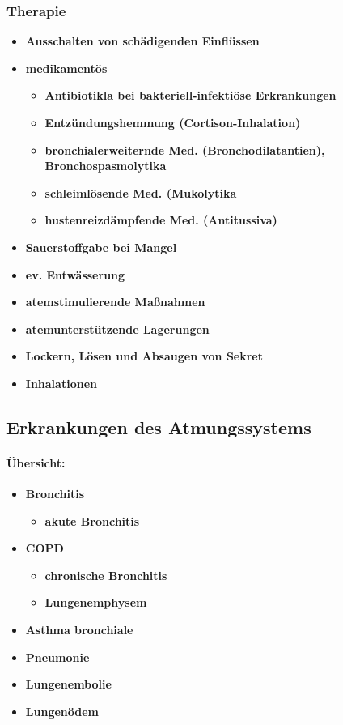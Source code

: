 		\subsubsection{Therapie}
			\begin{itemize}
				\item \textbf{Ausschalten von schädigenden Einflüssen}
				\item \textbf{medikamentös}
					\begin{itemize}
						\item \textbf{Antibiotikla bei bakteriell-infektiöse Erkrankungen}
						\item \textbf{Entzündungshemmung (Cortison-Inhalation)}
						\item \textbf{bronchialerweiternde Med. (Bronchodilatantien), Bronchospasmolytika}
						\item \textbf{schleimlösende Med. (Mukolytika}
						\item \textbf{hustenreizdämpfende Med. (Antitussiva)}
					\end{itemize}
				\item \textbf{Sauerstoffgabe bei Mangel}
				\item \textbf{ev. Entwässerung}
				\item \textbf{atemstimulierende Maßnahmen}
				\item \textbf{atemunterstützende Lagerungen}
				\item \textbf{Lockern, Lösen und Absaugen von Sekret}
				\item \textbf{Inhalationen}
			\end{itemize}
	\subsection{Erkrankungen des Atmungssystems}
		\paragraph*{\textbf{Übersicht:}}
		\begin{itemize}
			\item \textbf{Bronchitis}
				\begin{itemize}
					\item \textbf{akute Bronchitis}
				\end{itemize}
			\item \textbf{COPD}
				\begin{itemize}
					\item \textbf{chronische Bronchitis}
					\item \textbf{Lungenemphysem}
				\end{itemize}
			\item \textbf{Asthma bronchiale}
			\item \textbf{Pneumonie}
			\item \textbf{Lungenembolie}
			\item \textbf{Lungenödem}
		\end{itemize}
